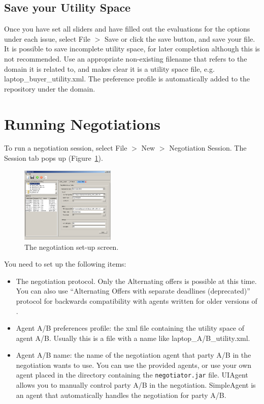 \documentclass[]{article}
\begin{document}
\subsection{Save your Utility Space}

Once you have set all sliders and have filled out the evaluations for the options under each issue, select File $>$ Save or click the save button, and save your file. It is possible to save incomplete utility space, for later completion although this is not recommended. Use an appropriate non-existing filename that refers to the domain it is related to, and makes clear it is a utility space file, e.g. laptop\_buyer\_utility.xml. The preference profile is automatically added to the repository under the domain.
 
\section{Running Negotiations}
To run a negotiation session, select File $>$ New $>$ Negotiation Session. The Session tab pops up (Figure~\ref{Fig:negotiation set-up}). 

\begin{figure}[htb]
	\centering
	\includegraphics[width=0.4\textwidth]{media/image11.png}
\caption{The negotiation set-up screen.}\label{Fig:negotiation set-up}
\end{figure}

You need to set up the following items:
\begin{itemize}
	\item The negotiation protocol. Only the Alternating offers is possible at this time. You can also use ``Alternating Offers with separate deadlines (deprecated)'' protocol for backwards compatibility with agents written for older versions of \Genius.
	\item Agent A/B preferences profile: the xml file containing the utility space of agent A/B. Usually this is a file with a name like laptop\_A/B\_utility.xml.
	\item Agent A/B name: the name of the negotiation agent that party A/B in the negotiation wants to use. You can use the provided agents, or use your own agent placed in the directory containing the \texttt{negotiator.jar} file. UIAgent allows you to manually control party A/B in the negotiation. SimpleAgent is an agent that automatically handles the negotiation for party A/B.
\end{itemize}
\end{document}
